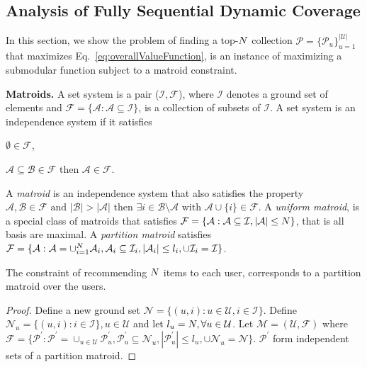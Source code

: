 \subsection{Analysis of Fully Sequential  Dynamic Coverage}
\label{sec:submodularmonotoneproof}
In this section, we show the problem of finding  a top-$N$ collection $\mathcal{P}  = \{ \mathcal{P}_u \}_{u=1}^ {|\mathcal{U}|} $ that maximizes Eq.~\ref{eq:overallValueFunction}, is an instance of  maximizing a submodular function subject to a matroid constraint.  

\vspace{4mm}
\noindent \textbf{Matroids.}
A set system is a pair ($\mathcal{I}, \mathcal{F}$), where $\mathcal{I}$ denotes a ground set of elements and $\mathcal{F} = \{\mathcal{A}: \mathcal{A} \subseteq \mathcal{I}\}$, is a collection of subsets of $\mathcal{I}$. %
A set system  is an independence system if it satisfies 
\begin{enumerate*}
\item $\emptyset \in \mathcal{F}$,
\item  $\mathcal{A} \subseteq \mathcal{B} \in \mathcal{F} \text{ then } \mathcal{A} \in  \mathcal{F}$. 
\end{enumerate*}
A \textit{matroid} is an independence system that also satisfies the property $\mathcal{A} ,\mathcal{B} \in \mathcal{F} \text{ and } |\mathcal{B}| > |\mathcal{A}| \text{ then } \exists i \in \mathcal{B} \setminus \mathcal{A} \text{ with } \mathcal{A} \cup \{i\} \in \mathcal{F}$. A \textit{uniform matroid}, is a special class of matroids that satisfies   $\mathcal{F} = \{\mathcal{A}: \mathcal{A} \subseteq \mathcal{I}, |\mathcal{A}| \leq N \}$, that is all basis are maximal. A \textit{partition matroid} satisfies  $\mathcal{F} = \{\mathcal{A}: \mathcal{A} = \cup_{i=1}^{N} \mathcal{A}_i, \mathcal{A}_i \subseteq \mathcal{I}_i, |\mathcal{A}_i| \leq  l_i, \cup \mathcal{I}_i = \mathcal{I}\}$. 
\begin{lemma}
\label{lemma1}
The constraint of recommending $N$ items to each user, corresponds to a partition matroid over the users. 
\end{lemma}
\begin{proof} 
Define a new ground set $\mathcal{N} = \{(u,i) :  u \in \mathcal{U}, i \in \mathcal{I} \}$. Define $\mathcal{N}_u = \{(u,i): i \in \mathcal{I} \} , u \in \mathcal{U}$ and let $l_u=N, \forall u \in \mathcal{U}$. Let $\mathcal{M} =(\mathcal{U}, \mathcal{F})$ where $\mathcal{F} = \{ \mathcal{P}^{'}: \mathcal{P}^{'}=\cup_{u \in \mathcal{U}} \mathcal{P}^{'}_u, \mathcal{P}^{'}_u \subseteq \mathcal{N}_u, |\mathcal{P}^{'}_u| \leq l_u, \cup \mathcal{N}_u = \mathcal{N}\}$. $\mathcal{P}^{'}$ form independent sets of a partition matroid.
\end{proof}

